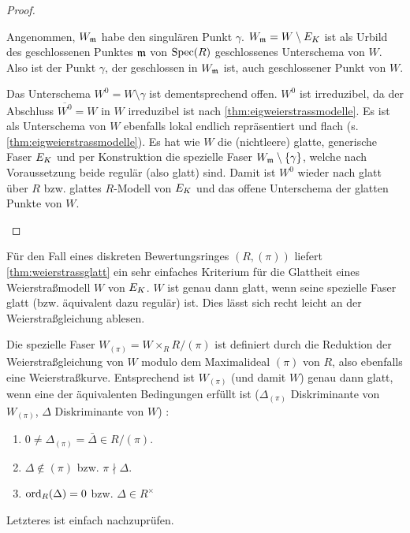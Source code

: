 \documentclass[german]{scrreprt}
\begin{document}
\begin{Lemma}
\begin{proof}
\begin{enumerate}[label=(\alph*)]
      Angenommen, $W_{\mathfrak{m}}$ habe den singulären Punkt $\gamma$.
      $W_{\mathfrak{m}}=W\setminus E_{K}$ ist als Urbild des geschlossenen Punktes
      $\mathfrak{m}$ von $\operatorname{Spec}(R)$ geschlossenes Unterschema von $W$.
      Also ist der Punkt $\gamma$, der geschlossen in $W_{\mathfrak{m}}$ ist, auch
      geschlossener Punkt von $W$.
      
      Das Unterschema $W^0=W\setminus\gamma$ ist dementsprechend offen.
      $W^0$ ist irreduzibel, da der Abschluss $\overline{W^0}=W$ in
      $W$ irreduzibel ist nach \autoref{thm:eigweierstrassmodelle}.
      Es ist als Unterschema von $W$ ebenfalls lokal endlich
      repräsentiert und flach (s. \autoref{thm:eigweierstrassmodelle}).
      Es hat wie $W$ die (nichtleere) glatte, generische Faser $E_{K}$ und
      per Konstruktion die spezielle Faser $W_{\mathfrak{m}}\setminus\{\gamma\}$,
      welche nach Voraussetzung beide regulär (also glatt) sind.
      Damit ist $W^0$ wieder nach \cite[8.5, Proposition 17]{bosch}
      glatt über $R$ bzw. glattes $R$-Modell von $E_{K}$ und das offene
      Unterschema der glatten Punkte von $W$.
    \end{enumerate}
  \end{proof}
\end{Lemma}


\begin{Bemerkung}\label{thm:weierstraßmodellglatt}
  Für den Fall eines diskreten Bewertungsringes $(R,(\pi))$ liefert
  \autoref{thm:weierstrassglatt} ein sehr einfaches Kriterium für die
  Glattheit eines Weierstraßmodell $W$ von $E_{K}$.
  $W$ ist genau dann glatt, wenn seine spezielle Faser glatt
  (bzw. äquivalent dazu regulär) ist.
  Dies lässt sich recht leicht an der Weierstraßgleichung ablesen.
  
  Die spezielle Faser $W_{(\pi)}=W\times_R R/(\pi)$ ist definiert
  durch die Reduktion der Weierstraßgleichung von $W$ modulo dem
  Maximalideal $(\pi)$ von $R$, also ebenfalls eine Weierstraßkurve.
  Entsprechend ist $W_{(\pi)}$ (und damit $W$) genau dann glatt, wenn
  eine der äquivalenten Bedingungen erfüllt ist
  ($\Delta_{(\pi)}$ Diskriminante von $W_{(\pi)}$,
  $\Delta$ Diskriminante von $W$)
  \cite[Proposition VII.5.1 (a)]{silverman}:
  \begin{enumerate}[label=(\roman*)]
  \item $0\neq\Delta_{(\pi)}=\bar\Delta\in R/(\pi)$.
  \item $\Delta\not\in(\pi)$ bzw. $\pi\nmid\Delta$.
  \item $\operatorname{ord}_R(\Delta)=0$ bzw. $\Delta\in R^\times$
  \end{enumerate}
  Letzteres ist einfach nachzuprüfen.
\end{Bemerkung}
\end{document}
